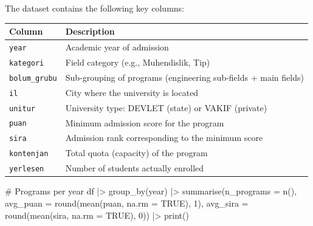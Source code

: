 \documentclass[
  11pt,
  a4paper,
  DIV=11,
  numbers=noendperiod]{scrartcl}
\newenvironment{Shaded}{\begin{snugshade}}{\end{snugshade}}
\newcommand{\AttributeTok}[1]{\textcolor[rgb]{0.40,0.45,0.13}{#1}}
\newcommand{\CommentTok}[1]{\textcolor[rgb]{0.37,0.37,0.37}{#1}}
\newcommand{\ConstantTok}[1]{\textcolor[rgb]{0.56,0.35,0.01}{#1}}
\newcommand{\DecValTok}[1]{\textcolor[rgb]{0.68,0.00,0.00}{#1}}
\newcommand{\FunctionTok}[1]{\textcolor[rgb]{0.28,0.35,0.67}{#1}}
\newcommand{\NormalTok}[1]{\textcolor[rgb]{0.00,0.23,0.31}{#1}}
\newcommand{\SpecialCharTok}[1]{\textcolor[rgb]{0.37,0.37,0.37}{#1}}
\begin{document}
The dataset contains the following key columns:

\begin{longtable}[]{@{}
  >{\raggedright\arraybackslash}p{}
  >{\raggedright\arraybackslash}p{}@{}}
\toprule\noalign{}
\begin{minipage}[b]{\linewidth}\raggedright
Column
\end{minipage} & \begin{minipage}[b]{\linewidth}\raggedright
Description
\end{minipage} \\
\midrule\noalign{}
\endhead
\bottomrule\noalign{}
\endlastfoot
\texttt{year} & Academic year of admission \\
\texttt{kategori} & Field category (e.g., Muhendislik, Tip) \\
\texttt{bolum\_grubu} & Sub-grouping of programs (engineering sub-fields
+ main fields) \\
\texttt{il} & City where the university is located \\
\texttt{unitur} & University type: DEVLET (state) or VAKIF (private) \\
\texttt{puan} & Minimum admission score for the program \\
\texttt{sira} & Admission rank corresponding to the minimum score \\
\texttt{kontenjan} & Total quota (capacity) of the program \\
\texttt{yerlesen} & Number of students actually enrolled \\
\end{longtable}

\begin{Shaded}
\begin{Highlighting}[]
\CommentTok{\# Programs per year}
\NormalTok{df }\SpecialCharTok{|\textgreater{}}
  \FunctionTok{group\_by}\NormalTok{(year) }\SpecialCharTok{|\textgreater{}}
  \FunctionTok{summarise}\NormalTok{(}\AttributeTok{n\_programs =} \FunctionTok{n}\NormalTok{(),}
            \AttributeTok{avg\_puan =} \FunctionTok{round}\NormalTok{(}\FunctionTok{mean}\NormalTok{(puan, }\AttributeTok{na.rm =} \ConstantTok{TRUE}\NormalTok{), }\DecValTok{1}\NormalTok{),}
            \AttributeTok{avg\_sira =} \FunctionTok{round}\NormalTok{(}\FunctionTok{mean}\NormalTok{(sira, }\AttributeTok{na.rm =} \ConstantTok{TRUE}\NormalTok{), }\DecValTok{0}\NormalTok{)) }\SpecialCharTok{|\textgreater{}}
  \FunctionTok{print}\NormalTok{()}
\end{Highlighting}
\end{Shaded}
\end{document}
